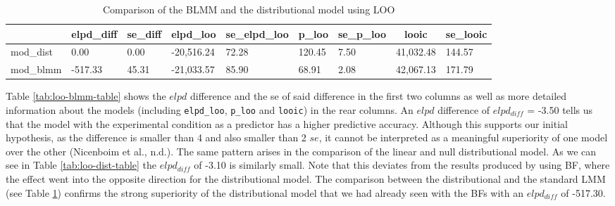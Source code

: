 \documentclass[
  doc,12pt,floatsintext]{apa7}
\begin{document}
\begin{table}[tbp]

\begin{center}
\begin{threeparttable}

\caption{\label{tab:loo-blmm-dist-table}Comparison of the BLMM and the distributional model using LOO}

\begin{tabular}{lllllllll}
\toprule
 & \multicolumn{1}{c}{elpd\_diff} & \multicolumn{1}{c}{se\_diff} & \multicolumn{1}{c}{elpd\_loo} & \multicolumn{1}{c}{se\_elpd\_loo} & \multicolumn{1}{c}{p\_loo} & \multicolumn{1}{c}{se\_p\_loo} & \multicolumn{1}{c}{looic} & \multicolumn{1}{c}{se\_looic}\\
\midrule
mod\_dist & 0.00 & 0.00 & -20,516.24 & 72.28 & 120.45 & 7.50 & 41,032.48 & 144.57\\
mod\_blmm & -517.33 & 45.31 & -21,033.57 & 85.90 & 68.91 & 2.08 & 42,067.13 & 171.79\\
\bottomrule
\end{tabular}

\end{threeparttable}
\end{center}

\end{table}

Table \ref{tab:loo-blmm-table} shows the \(elpd\) difference and the se of said difference in the first two columns as well as more detailed information about the models (including \texttt{elpd\_loo}, \texttt{p\_loo} and \texttt{looic}) in the rear columns. An \(elpd\) difference of \(elpd_{diff}\) = -3.50 tells us that the model with the experimental condition as a predictor has a higher predictive accuracy. Although this supports our initial hypothesis, as the difference is smaller than 4 and also smaller than 2 \(se\), it cannot be interpreted as a meaningful superiority of one model over the other (Nicenboim et al., n.d.). The same pattern arises in the comparison of the linear and null distributional model. As we can see in Table \ref{tab:loo-dist-table} the \(elpd_{diff}\) of -3.10 is similarly small. Note that this deviates from the results produced by using BF, where the effect went into the opposite direction for the distributional model. The comparison between the distributional and the standard LMM (see Table \ref{tab:loo-blmm-dist-table}) confirms the strong superiority of the distributional model that we had already seen with the BFs with an \(elpd_{diff}\) of -517.30.
\end{document}

